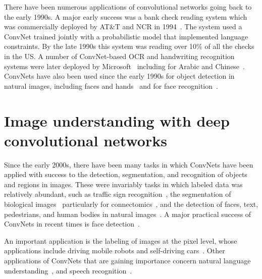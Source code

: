 \documentclass[10pts]{article}
\begin{document}
There have been numerous applications of convolutional networks going
back to the early 1990s. A major early success was a bank check
reading system which was commercially deployed by AT\&T and NCR in
1994~\citep{lecun-98}. The system used a ConvNet trained jointly with
a probabilistic model that implemented language constraints. By the
late 1990s this system was reading over 10\% of all the checks in the
US. A number of ConvNet-based OCR and handwriting recognition systems
were later deployed by
Microsoft~\citep{simard-03,chellapilla-ist-06,chellapilla-iwfhr-06b}
including for Arabic and
Chinese~\citep{abdulkader-iwfhr-06,chellapilla-iwfhr-06a}. ConvNets
have also been used since the early 1990s for object detection in
natural images, including faces and
hands~\cite{vaillant-monrocq-lecun-94,nowlan-platt-95} and for face
recognition~\cite{lawrence-tnn-1997}.


\section{Image understanding with deep convolutional networks}

Since the early 2000s, there have been many tasks in which ConvNets
have been applied with success to the detection, segmentation, and
recognition of objects and regions in images. These were invariably
tasks in which labeled data was relatively abundant, such as traffic
sign recognition~\cite{sermanet-ijcnn-11,Ciresan-et-al-2012}, the
segmentation of biological images~\cite{ning-05} particularly for
connectomics~\cite{Turaga2010}, and the detection of faces, text,
pedestrians, and human bodies in natural
images~\cite{vaillant-monrocq-lecun-94,nowlan-platt-95,garcia-delakis-04,osadchy-07,
  nasse-09,fan-pami-2010,Jain-et-al-arxiv2013,sermanet-cvpr-13,Tompson-et-al-arxiv2014}.
A major practical success of ConvNets in recent times is face
detection~\citep{taigman-cvpr-2014}.

An important application is the labeling of images at the pixel level,
whose applications include driving mobile robots and self-driving
cars~\cite{hadsell-jfr-09,farabet-icml-12}. Other applications of
ConvNets that are gaining importance concern natural language
understanding~\citep{collobert:2011b}, and speech
recognition~\cite{Sainath-et-al-ICASSP2013}.
\end{document}
